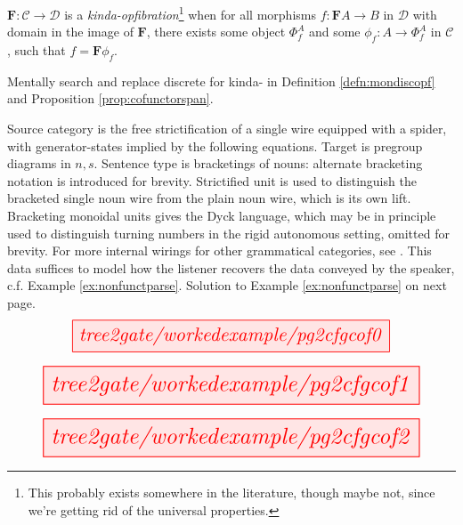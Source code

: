 \begin{defn}\label{defn:discopf}
$\mathbf{F}: \mathcal{C} \rightarrow \mathcal{D}$ is a \emph{kinda-opfibration}\footnote{This probably exists somewhere in the literature, though maybe not, since we're getting rid of the universal properties.} when for all morphisms $f: \mathbf{F}A \rightarrow B$ in $\mathcal{D}$ with domain in the image of $\mathbf{F}$, there exists some object $\Phi^A_f$ and some $\phi_f: A \rightarrow \Phi^A_f$ in $\mathcal{C}$, such that $f = \mathbf{F}\phi_f$.
\end{defn}

\begin{defn}
Mentally search and replace discrete for kinda- in Definition \ref{defn:mondiscopf} and Proposition \ref{prop:cofunctorspan}.
\end{defn}

\clearpage
\newpage

\begin{myboxR}
\begin{example}\label{ex:bigexlift}
\end{example}
Source category is the free strictification of a single wire equipped with a spider, with generator-states implied by the following equations. Target is pregroup diagrams in $n,s$. Sentence type is bracketings of nouns: alternate bracketing notation is introduced for brevity. Strictified unit is used to distinguish the bracketed single noun wire from the plain noun wire, which is its own lift. Bracketing monoidal units gives the Dyck language, which may be in principle used to distinguish turning numbers in the rigid autonomous setting, omitted for brevity. For more internal wirings for other grammatical categories, see \citep{wang-mascianica_internal_nodate}. This data suffices to model how the listener recovers the data conveyed by the speaker, c.f. Example \ref{ex:nonfunctparse}. Solution to Example \ref{ex:nonfunctparse} on next page.
\[\resizebox{0.8\textwidth}{!}{\tikzfig{tree2gate/workedexample/pg2cfgcof0}}\]
\end{myboxR}

\begin{myboxB}
\[\resizebox{0.95\textwidth}{!}{\tikzfig{tree2gate/workedexample/pg2cfgcof1}}\]
\end{myboxB}

\begin{myboxB}
\[\resizebox{0.95\textwidth}{!}{\tikzfig{tree2gate/workedexample/pg2cfgcof2}}\]
\end{myboxB}

